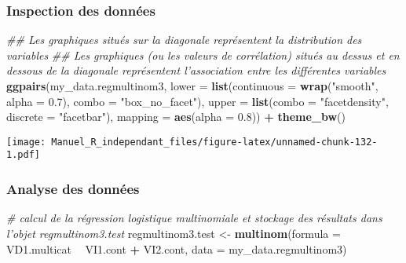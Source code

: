 \documentclass[
]{book}
\newenvironment{Shaded}{\begin{snugshade}}{\end{snugshade}}
\newcommand{\CommentTok}[1]{\textcolor[rgb]{0.56,0.35,0.01}{\textit{#1}}}
\newcommand{\DataTypeTok}[1]{\textcolor[rgb]{0.13,0.29,0.53}{#1}}
\newcommand{\FloatTok}[1]{\textcolor[rgb]{0.00,0.00,0.81}{#1}}
\newcommand{\KeywordTok}[1]{\textcolor[rgb]{0.13,0.29,0.53}{\textbf{#1}}}
\newcommand{\NormalTok}[1]{#1}
\newcommand{\OperatorTok}[1]{\textcolor[rgb]{0.81,0.36,0.00}{\textbf{#1}}}
\newcommand{\StringTok}[1]{\textcolor[rgb]{0.31,0.60,0.02}{#1}}
\begin{document}
\hypertarget{inspection-des-donnuxe9es-14}{%
\subsubsection{Inspection des données}\label{inspection-des-donnuxe9es-14}}

\begin{Shaded}
\begin{Highlighting}[]
\CommentTok{## Les graphiques situés sur la diagonale représentent la distribution des variables}
\CommentTok{## Les graphiques (ou les valeurs de corrélation) situés au dessus et en dessous de la diagonale représentent l'association entre les différentes variables}
\KeywordTok{ggpairs}\NormalTok{(my_data.regmultinom3,}
        \DataTypeTok{lower =} \KeywordTok{list}\NormalTok{(}\DataTypeTok{continuous =} \KeywordTok{wrap}\NormalTok{(}\StringTok{"smooth"}\NormalTok{, }\DataTypeTok{alpha =} \FloatTok{0.7}\NormalTok{), }\DataTypeTok{combo =} \StringTok{"box_no_facet"}\NormalTok{),}
        \DataTypeTok{upper =} \KeywordTok{list}\NormalTok{(}\DataTypeTok{combo =} \StringTok{"facetdensity"}\NormalTok{, }\DataTypeTok{discrete =} \StringTok{"facetbar"}\NormalTok{), }
        \DataTypeTok{mapping =} \KeywordTok{aes}\NormalTok{(}\DataTypeTok{alpha =} \FloatTok{0.8}\NormalTok{)) }\OperatorTok{+}\StringTok{ }\KeywordTok{theme_bw}\NormalTok{()}
\end{Highlighting}
\end{Shaded}

\texttt{[image: Manuel\_R\_independant\_files/figure-latex/unnamed-chunk-132-1.pdf]}

\hypertarget{analyse-des-donnuxe9es-15}{%
\subsubsection{Analyse des données}\label{analyse-des-donnuxe9es-15}}

\begin{Shaded}
\begin{Highlighting}[]
\CommentTok{# calcul de la régression logistique multinomiale et stockage des résultats dans l’objet regmultinom3.test}
\NormalTok{regmultinom3.test <-}\StringTok{ }\KeywordTok{multinom}\NormalTok{(}\DataTypeTok{formula =}\NormalTok{ VD1.multicat }\OperatorTok{~}\StringTok{ }\NormalTok{VI1.cont }\OperatorTok{+}\StringTok{ }\NormalTok{VI2.cont, }
                              \DataTypeTok{data =}\NormalTok{ my_data.regmultinom3)}
\end{Highlighting}
\end{Shaded}
\end{document}
